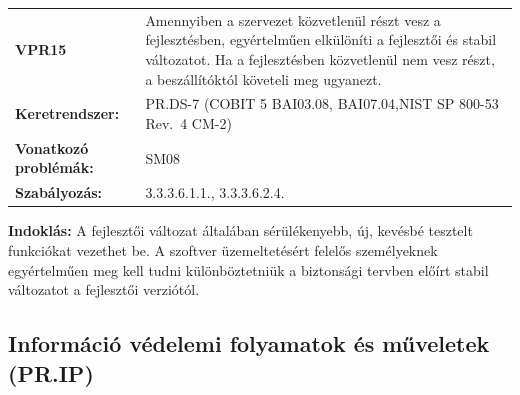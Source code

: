 \documentclass[12pt,magyar,a4paper,oneside]{scrreprt}
\begin{document}
\begin{longtable}[]{@{}ll@{}}
\toprule
\endhead
\begin{minipage}[t]{0.16\columnwidth}\raggedright
\textbf{VPR15}\strut
\end{minipage} & \begin{minipage}[t]{0.79\columnwidth}\raggedright
Amennyiben a szervezet közvetlenül részt vesz a fejlesztésben,
egyértelműen elkülöníti a fejlesztői és stabil változatot. Ha a
fejlesztésben közvetlenül nem vesz részt, a beszállítóktól követeli meg
ugyanezt.\strut
\end{minipage}\tabularnewline
\begin{minipage}[t]{0.16\columnwidth}\raggedright
\textbf{Keretrendszer:}\strut
\end{minipage} & \begin{minipage}[t]{0.79\columnwidth}\raggedright
PR.DS-7 (COBIT 5 BAI03.08, BAI07.04,NIST SP 800-53 Rev.~4 CM-2)\strut
\end{minipage}\tabularnewline
\begin{minipage}[t]{0.16\columnwidth}\raggedright
\textbf{Vonatkozó problémák:}\strut
\end{minipage} & \begin{minipage}[t]{0.79\columnwidth}\raggedright
SM08\strut
\end{minipage}\tabularnewline
\begin{minipage}[t]{0.16\columnwidth}\raggedright
\textbf{Szabályozás:}\strut
\end{minipage} & \begin{minipage}[t]{0.79\columnwidth}\raggedright
3.3.3.6.1.1., 3.3.3.6.2.4.\strut
\end{minipage}\tabularnewline
\bottomrule
\end{longtable}

\textbf{Indoklás: } A fejlesztői változat általában sérülékenyebb, új,
kevésbé tesztelt funkciókat vezethet be. A szoftver üzemeltetésért
felelős személyeknek egyértelműen meg kell tudni különböztetniük a
biztonsági tervben előírt stabil változatot a fejlesztői verziótól.

\hypertarget{informuxe1ciuxf3-vuxe9delemi-folyamatok-uxe9s-mux171veletek-pr.ip}{%
\subsection{Információ védelemi folyamatok és műveletek
(PR.IP)}\label{informuxe1ciuxf3-vuxe9delemi-folyamatok-uxe9s-mux171veletek-pr.ip}}
\end{document}
